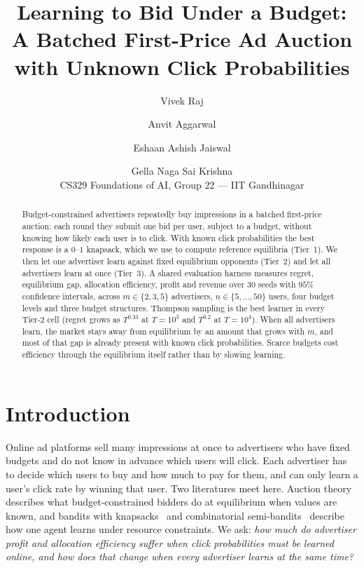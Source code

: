 \documentclass[11pt]{article}
\title{Learning to Bid Under a Budget: A Batched First-Price Ad Auction\\with Unknown Click Probabilities}
\author{Vivek Raj \and Anvit Aggarwal \and Eshaan Ashish Jaiswal \and Gella Naga Sai Krishna\\[0.3em]
\small CS329 Foundations of AI, Group 22 --- IIT Gandhinagar}
\date{}
\theoremstyle{remark}
\begin{document}
\maketitle
\vspace{-1.5em}

\begin{abstract}
Budget-constrained advertisers repeatedly buy impressions in a batched first-price auction: each round
they submit one bid per user, subject to a budget, without knowing how likely each user is to click.
With known click probabilities the best response is a $0$--$1$ knapsack, which we use to compute
reference equilibria (Tier~1). We then let one advertiser learn against fixed equilibrium opponents
(Tier~2) and let all advertisers learn at once (Tier~3). A shared evaluation harness measures regret,
equilibrium gap, allocation efficiency, profit and revenue over $30$ seeds with $95\%$ confidence
intervals, across $m\in\{2,3,5\}$ advertisers, $n\in\{5,\dots,50\}$ users, four budget levels and three
budget structures. Thompson sampling is the best learner in every Tier-2 cell (regret grows as
$T^{0.33}$ at $T=10^3$ and $T^{0.2}$ at $T=10^4$). When all advertisers learn, the market stays away
from equilibrium by an amount that grows with $m$, and most of that gap is already present with known
click probabilities. Scarce budgets cost efficiency through the equilibrium itself rather than by slowing learning.
\end{abstract}

\section{Introduction}
Online ad platforms sell many impressions at once to advertisers who have fixed budgets and do not
know in advance which users will click. Each advertiser has to decide which users to buy and how much
to pay for them, and can only learn a user's click rate by winning that user. Two literatures meet
here. Auction theory describes what budget-constrained bidders do at equilibrium when values are known,
and bandits with knapsacks~\citep{badanidiyuru2013bandits} and combinatorial
semi-bandits~\citep{chen2013combinatorial} describe how one agent learns under resource constraints.
We ask: \emph{how much do advertiser profit and allocation efficiency suffer when click probabilities
must be learned online, and how does that change when every advertiser learns at the same time?}
\end{document}
